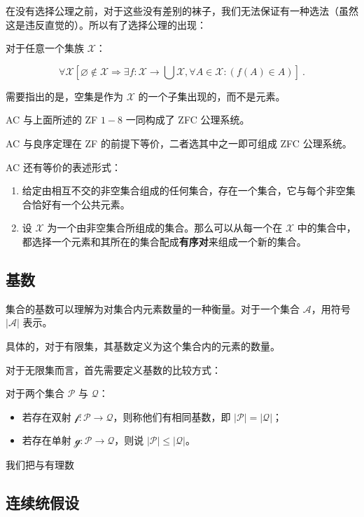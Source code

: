 在没有选择公理之前，对于这些没有差别的袜子，我们无法保证有一种选法（虽然这是违反直觉的）。所以有了选择公理的出现：

对于任意一个集族 $\mathscr X$：

$$\forall \mathscr X \left[\varnothing \not \in \mathscr X \Rightarrow \exists f: \mathscr X \rightarrow \bigcup \mathscr X, \forall A \in \mathscr X: \left(f(A) \in A\right)\right] ~.$$

需要指出的是，空集是作为 $\mathscr X$ 的一个子集出现的，而不是元素。


AC 与上面所述的 ZF $1-8$ 一同构成了 ZFC 公理系统。

AC 与良序定理在 ZF 的前提下等价，二者选其中之一即可组成 ZFC 公理系统。

AC 还有等价的表述形式：

\begin{enumerate}
\item 给定由相互不交的非空集合组成的任何集合，存在一个集合，它与每个非空集合恰好有一个公共元素。
\item 设 $\mathscr X$ 为一个由非空集合所组成的集合。那么可以从每一个在 $\mathscr X$ 中的集合中，都选择一个元素和其所在的集合配成\textbf{有序对}来组成一个新的集合。
\end{enumerate}

\subsection{基数}
集合的基数可以理解为对集合内元素数量的一种衡量。对于一个集合 $\mathscr A$，用符号 $\left|\mathscr A\right|$ 表示。

具体的，对于有限集，其基数定义为这个集合内的元素的数量。

对于无限集而言，首先需要定义基数的比较方式：

对于两个集合 $\mathscr P$ 与 $\mathscr Q$：
\begin{itemize}
\item 若存在双射 $\mathscr f: \mathscr P \rightarrow \mathscr Q$，则称他们有相同基数，即 $|\mathscr P| = |\mathscr Q|$；
\item 若存在单射 $\mathscr g: \mathscr P \rightarrow \mathscr Q$，则说 $|\mathscr P| \le |\mathscr Q|$。
\end{itemize}

我们把与有理数

\subsection{连续统假设}



